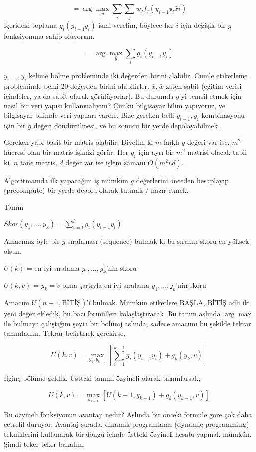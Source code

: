 \documentclass[12pt,fleqn]{article}\usepackage{../../common}
\begin{document}
$$ = \arg\max_{\bar{y}}  \sum_i  \sum_j w_j f_j(y_{i-1}y_i \bar{x} i )$$
İçerideki toplama $g_i(y_{i-1}y_i)$ ismi verelim, böylece her $i$ için
değişik bir $g$ fonksiyonuna sahip oluyorum. 

$$  = \arg\max_{\bar{y}}  \sum_i  g_i(y_{i-1}y_i) $$

$y_{i-1},y_i$ kelime bölme probleminde iki değerden birini alabilir. Cümle
etiketleme probleminde belki 20 değerden birini alabilirler. $\bar{x},\bar{w}$ zaten 
sabit (eğitim verisi içindeler, ya da sabit olarak görülüyorlar). Bu 
durumda $g$'yi temsil etmek için nasıl bir veri yapısı kullanmalıyım? Çünkü
bilgisayar bilim yapıyoruz, ve bilgisayar bilimde veri yapıları vardır. 
Bize gereken belli $y_{i-1},y_i$ kombinasyonu için bir $g$ değeri
döndürülmesi, ve bu sonucu bir yerde depolayabilmek.

Gereken yapı basit bir matris olabilir. Diyelim ki $m$ farklı $y$ değeri
var ise, $m^2$ hücresi olan bir matris işimizi görür. Her $g_i$ için ayrı
bir $m^2$ matrisi olacak tabii ki. $n$ tane matris, $d$ değer var ise 
işlem zamanı $O(m^2nd)$. 

Algoritmamda ilk yapacağım iş mümkün $g$ değerlerini önceden hesaplayıp
(precompute) bir yerde depolu olarak tutmak / hazır etmek. 

Tanım

$Skor(y_1,...,y_k) = \sum_{i=1}^{k} g_i(y_{i-1} y_i)$

Amacımız öyle bir $y$ sıralaması (sequence) bulmak ki bu sıranın skoru 
en yüksek olsun. 

$U(k)$ = en iyi sıralama $y_1,...,y_k$'nin skoru

$U(k,v)$ = $y_k=v$ olma şartıyla en iyi sıralama $y_1,...,y_k$'nin skoru

Amacım $U(n+1, \textrm{BİTİŞ})$'i bulmak. Mümkün etiketlere BAŞLA, BİTİŞ adlı iki
yeni değer ekledik, bu bazı formülleri kolaşlaştıracak. Bu tanım aslında
$\arg\max$ ile bulmaya çalıştığım şeyin bir bölümj aslında, sadece amacımı
bu şekilde tekrar tanımladım. Tekrar belirtmek gerekirse, 

$$U(k,v) = \max_{y_1,y_{k-1}}  [ \sum_{ i=1}^{k-1}  g_i(y_{i-1}y_i) +  g_k(y_k,v) ]$$

İlginç bölüme geldik. Üstteki tanımı özyineli olarak tanımlarsak, 

$$ U(k,v) = \max_{y_{k-1}} [ U({k-1},y_{k-1}) + g_k(y_{k-1},v)]  $$

Bu özyineli fonksiyonun avantajı nedir? Aslında bir önceki formüle göre çok
daha çetrefil duruyor. Avantaj şurada, dinamik programlama (dynamiç
programming) tekniklerini kullanarak bir döngü içinde üstteki özyineli
hesabı yapmak mümkün. Şimdi teker teker bakalım,
\end{document}

